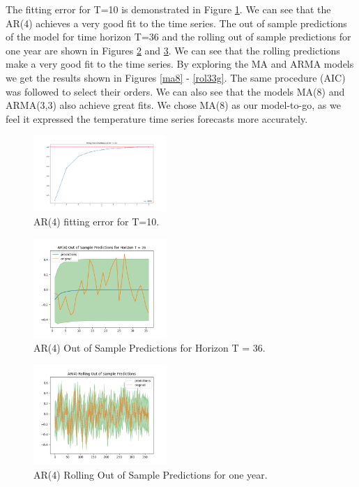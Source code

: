 \documentclass[conference]{IEEEtran}
\begin{document}
The fitting error for T=10 is demonstrated in Figure \ref{fe4}. We can see that the AR(4) achieves a very good fit to the time series. The out of sample predictions of the model for time horizon T=36 and the rolling out of sample predictions for one year are shown in Figures \ref{hor4} and \ref{rol4}. We can see that the rolling predictions make a very good fit to the time series. By exploring the MA and ARMA models we get the results shown in Figures \ref{ma8} - \ref{rol33g}. The same procedure (AIC) was followed to select their orders. We can also see that the models MA(8) and ARMA(3,3) also achieve great fits. We chose MA(8) as our model-to-go, as we feel it expressed the temperature time series forecasts more accurately.
\vspace{80mm}

\begin{figure}[ht]
    \centering
    \includegraphics[width=0.45\textwidth]{Figures/GlasnevinLin/Fitting Error of ARIMA(4,0,0) for T = 10.png}
    \caption{AR(4) fitting error for T=10.}
    \label{fe4}
\end{figure}

\begin{figure}[ht]
    \centering
    \includegraphics[width=0.45\textwidth]{Figures/GlasnevinLin/AR(4) Out of Sample Predictions for Horizon T = 36.png}
    \caption{AR(4) Out of Sample Predictions for Horizon T = 36.}
    \label{hor4}
\end{figure}

\begin{figure}[ht]
    \centering
    \includegraphics[width=0.45\textwidth]{Figures/GlasnevinLin/AR(4) Rolling Out of Sample Predictions.png}
    \caption{AR(4) Rolling Out of Sample Predictions for one year.}
    \label{rol4}
\end{figure}
\vspace{80mm}
\end{document}
